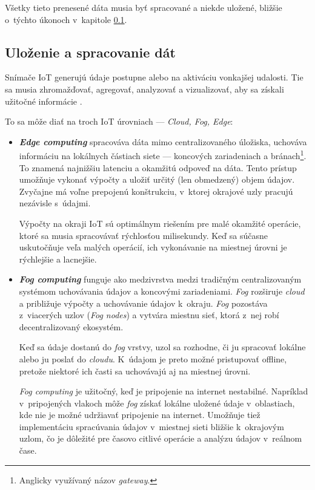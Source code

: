 Všetky tieto prenesené dáta musia byť spracované a niekde uložené, bližšie o~týchto úkonoch v~kapitole \ref{iot-data}.


\subsection{Uloženie a spracovanie dát}\label{iot-data}
Snímače IoT generujú údaje postupne alebo na aktiváciu vonkajšej udalosti. 
Tie sa musia zhromažďovať, agregovať, analyzovať a vizualizovať, aby sa získali užitočné informácie \cite{s20216076}.


To sa môže diať na troch IoT úrovniach — \emph{Cloud, Fog, Edge}:
\begin{itemize}
    \item \textit{\textbf{Edge computing}} spracováva dáta mimo centralizovaného úložiska, uchováva informáciu na lokálnych částiach siete — koncových zariadeniach a bránach\footnote{Anglicky využívaný názov \emph{gateway}.}. 
    To znamená najnižšiu latenciu a okamžitú odpoveď na dáta. 
    Tento prístup umožňuje vykonať výpočty a uložiť určitý (len obmedzený) objem údajov. 
    Zvyčajne má voľne prepojenú konštrukciu, v~ktorej okrajové uzly pracujú nezávisle s~údajmi.~\cite{teamDigetum_2022}
    
    Výpočty na okraji IoT sú optimálnym riešením pre malé okamžité operácie, ktoré sa musia spracovávať rýchlosťou milisekundy. 
    Keď sa súčasne uskutočňuje veľa malých operácií, ich vykonávanie na miestnej úrovni je rýchlejšie a lacnejšie.~\cite{teamDigetum_2022}
    
    \item \textit{\textbf{Fog computing}} funguje ako medzivrstva medzi tradičným centralizovaným systémom uchovávania údajov a koncovými zariadeniami. 
    \emph{Fog} rozširuje \emph{cloud} a približuje výpočty a uchovávanie údajov k~okraju. 
    \emph{Fog} pozostáva z~viacerých uzlov (\emph{Fog nodes}) a vytvára miestnu sieť, ktorá z~nej robí decentralizovaný ekosystém. ~\cite{teamDigetum_2022}
    
    Keď sa údaje dostanú do \emph{fog} vrstvy, uzol sa rozhodne, či ju spracovať lokálne alebo ju poslať do \emph{cloudu}. 
    K~údajom je preto možné pristupovať offline, pretože niektoré ich časti sa uchovávajú aj na miestnej úrovni.~\cite{teamDigetum_2022}
    
    \emph{Fog computing} je užitočný, keď je pripojenie na internet nestabilné. 
    Napríklad v~pripojených vlakoch môže \emph{fog} získať lokálne uložené údaje v~oblastiach, kde nie je možné udržiavať pripojenie na internet. 
    Umožňuje tiež implementáciu spracúvania údajov v~miestnej sieti bližšie k~okrajovým uzlom, čo je dôležité pre časovo citlivé operácie a analýzu údajov v~reálnom čase.~\cite{teamDigetum_2022}


\end{itemize}
